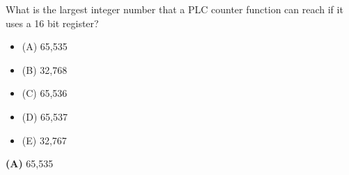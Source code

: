 

What is the largest integer number that a PLC counter function can reach if it uses a 16 bit register?

\begin{itemize}
\item{(A)} 65,535
\vskip 5pt 
\item{(B)} 32,768
\vskip 5pt 
\item{(C)} 65,536
\vskip 5pt 
\item{(D)} 65,537
\vskip 5pt 
\item{(E)} 32,767
\end{itemize}







{\bf (A)} 65,535
 










